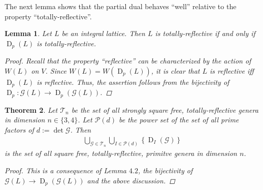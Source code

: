 \documentclass{amsart}
\newtheorem{thm}{Theorem}[section]
\newtheorem{lem}[thm]{Lemma}
\theoremstyle{definition}
\theoremstyle{remark}
\def\CG{{\mathcal G}}
\def\CG{{\mathcal G}}
\def\CP{{\mathcal P}}
\def\CT{{\mathcal T}}
\DeclareMathOperator{\D}{D}
\begin{document}
The next lemma shows that the partial dual behaves ``well'' relative to the property ``totally-reflective''.
\begin{lem}
 Let $L$ be an integral lattice. Then $L$ is totally-reflective if and only if $\D_p(L)$ is totally-reflective.
 \begin{proof}
  Recall that the property ``reflective'' can be characterized by the action of $W(L)$ on $V$. Since $W(L)=W(\D_p(L))$, it is clear that $L$ is reflective iff $\D_p(L)$ is reflective.
  Thus, the assertion follows from the bijectivity of $\D_p: \CG(L) \longrightarrow \D_p(\CG(L))$.
 \end{proof}
\end{lem}
\begin{thm}
 Let $\CT_{n}$ be the set of all strongly square free, totally-reflective genera in dimension $n \in \{3,4\}$. Let $\CP(d)$ be the power set of the set of all prime factors of $d:=\det \CG$.
 Then 
 \begin{align*}
    \bigcup_{\CG \in \CT_n} \bigcup_{I \in \CP(d)} \left\{\D_I(\CG)\right\} 
 \end{align*}
 is the set of all square free, totally-reflective, primitve genera in dimension $n$.
\begin{proof}
 This is a consequence of Lemma $4.2$, the bijectivity of $\CG(L) \longrightarrow \D_p(\CG(L))$ and the above discussion.
\end{proof}
\end{thm}
\end{document}
